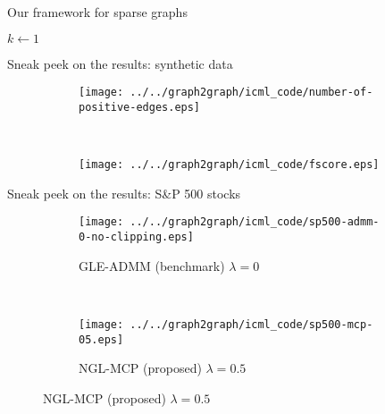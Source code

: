 \documentclass[aspectratio=169]{beamer}
\begin{document}
                \begin{frame}{Our framework for sparse graphs}
          \begin{algorithm}[H]
           \caption{Connected sparse graph learning}
             \SetAlgoLined
             $k \leftarrow 1$\\
         \end{algorithm}
\end{frame}

    \begin{frame}{Sneak peek on the results: synthetic data}
      \vspace{.75cm}
       \begin{figure}[!htb]
         \captionsetup[subfigure]{justification=centering}
       \centering
        \begin{subfigure}[t]{0.49\textwidth}
        \centering
         \texttt{[image: ../../graph2graph/icml\_code/number-of-positive-edges.eps]}
       \end{subfigure}~~~%
       \begin{subfigure}[t]{0.49\textwidth}
         \centering
          \texttt{[image: ../../graph2graph/icml\_code/fscore.eps]}
        \end{subfigure}
       \end{figure}
    \end{frame}

    \begin{frame}{Sneak peek on the results: S\&P 500 stocks}
  \vspace{.5cm}
     \begin{figure}[!htb]
       \captionsetup[subfigure]{justification=centering}
     \centering
      \begin{subfigure}[t]{0.49\textwidth}
      \centering
       \texttt{[image: ../../graph2graph/icml\_code/sp500-admm-0-no-clipping.eps]}
       \caption{GLE-ADMM (benchmark) $\lambda = 0$}
     \end{subfigure}~~~%
     \begin{subfigure}[t]{0.49\textwidth}
      \centering
       \texttt{[image: ../../graph2graph/icml\_code/sp500-mcp-05.eps]}
       \caption{NGL-MCP (proposed) $\lambda = 0.5$}
     \end{subfigure}
     \end{figure}
    \end{frame}
\end{document}
